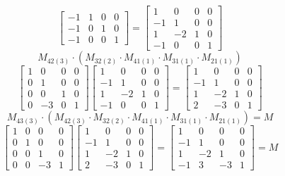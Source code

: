 \documentclass[leqno]{article}
\begin{document}
\begin{enumerate}
\begin{sol}
$$\begin{bmatrix}
			-1 & 1 & 0 & 0\\
			-1 & 0 & 1 & 0\\
			-1 & 0 & 0 & 1
		\end{bmatrix} =
		\begin{bmatrix}
			1 & 0 & 0 & 0\\
			-1 & 1 & 0 & 0\\
			1 & -2 & 1 & 0\\
			-1 & 0 & 0 & 1
		\end{bmatrix}$$
		$$M_{42(3)} \cdot (M_{32(2)} \cdot M_{41(1)} \cdot M_{31(1)} \cdot M_{21(1)})$$
		$$\begin{bmatrix}
			1 & 0 & 0 & 0\\
			0 & 1 & 0 & 0\\
			0 & 0 & 1 & 0\\
			0 & -3 & 0 & 1
		\end{bmatrix}
		\begin{bmatrix}
			1 & 0 & 0 & 0\\
			-1 & 1 & 0 & 0\\
			1 & -2 & 1 & 0\\
			-1 & 0 & 0 & 1
		\end{bmatrix} =
		\begin{bmatrix}
			1 & 0 & 0 & 0\\
			-1 & 1 & 0 & 0\\
			1 & -2 & 1 & 0\\
			2 & -3 & 0 & 1
		\end{bmatrix}$$
		$$M_{43(3)} \cdot (M_{42(3)} \cdot M_{32(2)} \cdot M_{41(1)} \cdot M_{31(1)} \cdot M_{21(1)}) = M$$
		$$\begin{bmatrix}
			1 & 0 & 0 & 0\\
			0 & 1 & 0 & 0\\
			0 & 0 & 1 & 0\\
			0 & 0 & -3 & 1
		\end{bmatrix}
		\begin{bmatrix}
			1 & 0 & 0 & 0\\
			-1 & 1 & 0 & 0\\
			1 & -2 & 1 & 0\\
			2 & -3 & 0 & 1
		\end{bmatrix} =
		\begin{bmatrix}
			1 & 0 & 0 & 0\\
			-1 & 1 & 0 & 0\\
			1 & -2 & 1 & 0\\
			-1 & 3 & -3 & 1
		\end{bmatrix} = M$$ 
		\end{sol} 
		

\end{enumerate}
\end{document}
